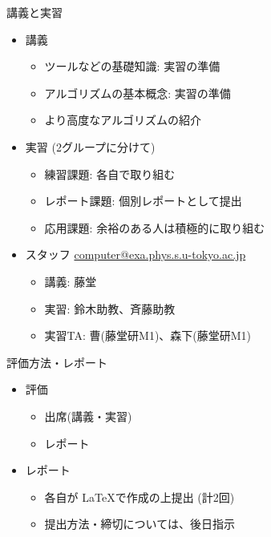 \begin{frame}[t,fragile]{講義と実習}
  \begin{itemize}
  \item 講義
    \begin{itemize}
    \item ツールなどの基礎知識: 実習の準備
    \item アルゴリズムの基本概念: 実習の準備
    \item より高度なアルゴリズムの紹介
    \end{itemize}
  \item 実習 (2グループに分けて)
    \begin{itemize}
    \item 練習課題: 各自で取り組む
    \item レポート課題: 個別レポートとして提出
    \item 応用課題: 余裕のある人は積極的に取り組む
    \end{itemize}
  \item スタッフ \href{mailto:computer@exa.phys.s.u-tokyo.ac.jp}{computer@exa.phys.s.u-tokyo.ac.jp}
    \begin{itemize}
    \item 講義: 藤堂
    \item 実習: 鈴木助教、斉藤助教
    \item 実習TA: 曹(藤堂研M1)、森下(藤堂研M1)
    \end{itemize}
  \end{itemize}    
\end{frame}

\begin{frame}[t,fragile]{評価方法・レポート}
  \begin{itemize}
  \item 評価
    \begin{itemize}
    \item 出席(講義・実習)
    \item レポート
    \end{itemize}    
  \item レポート
    \begin{itemize}
    \item 各自が \LaTeX で作成の上提出 (計2回)
    \item 提出方法・締切については、後日指示
    \end{itemize}
  \end{itemize}    
\end{frame}

